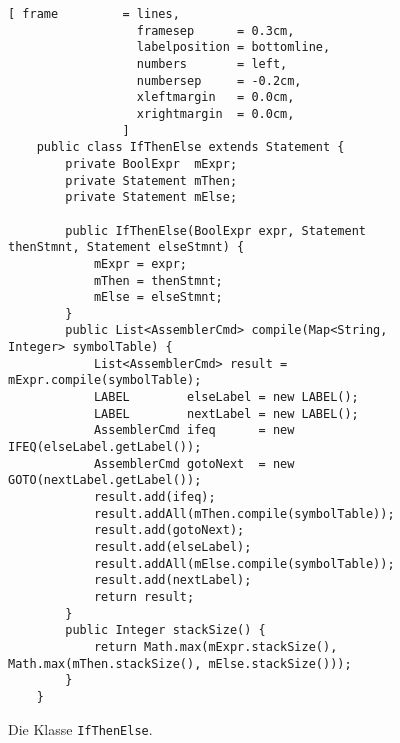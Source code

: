 \begin{figure}[!ht]
\centering
\begin{Verbatim}[ frame         = lines, 
                  framesep      = 0.3cm, 
                  labelposition = bottomline,
                  numbers       = left,
                  numbersep     = -0.2cm,
                  xleftmargin   = 0.0cm,
                  xrightmargin  = 0.0cm,
                ]
    public class IfThenElse extends Statement {
        private BoolExpr  mExpr;
        private Statement mThen;
        private Statement mElse;
    
        public IfThenElse(BoolExpr expr, Statement thenStmnt, Statement elseStmnt) {
            mExpr = expr;
            mThen = thenStmnt;
            mElse = elseStmnt;
        }
        public List<AssemblerCmd> compile(Map<String, Integer> symbolTable) {
            List<AssemblerCmd> result = mExpr.compile(symbolTable);
            LABEL        elseLabel = new LABEL();
            LABEL        nextLabel = new LABEL();
            AssemblerCmd ifeq      = new IFEQ(elseLabel.getLabel());
            AssemblerCmd gotoNext  = new GOTO(nextLabel.getLabel());
            result.add(ifeq);
            result.addAll(mThen.compile(symbolTable));
            result.add(gotoNext);
            result.add(elseLabel);
            result.addAll(mElse.compile(symbolTable));
            result.add(nextLabel);
            return result;
        }
        public Integer stackSize() {
            return Math.max(mExpr.stackSize(), Math.max(mThen.stackSize(), mElse.stackSize()));
        }
    }
\end{Verbatim}
\vspace*{-0.3cm}
\caption{Die Klasse \texttt{IfThenElse}.}
\label{fig:Statement:IfThenElse.java}
\end{figure}

